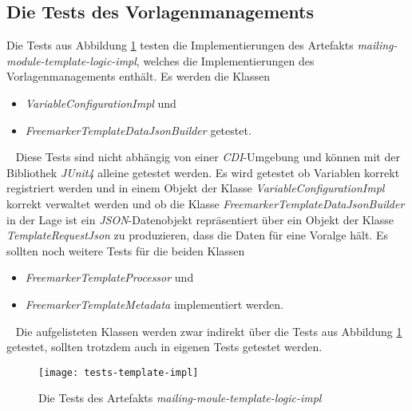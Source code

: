 \subsection{Die Tests des Vorlagenmanagements}
Die Tests aus Abbildung \ref{fig:tests-template-impl} testen die Implementierungen des Artefakts \emph{mailing-module-template-logic-impl}, welches die Implementierungen des Vorlagenmanagements enthält. Es werden die Klassen
\begin{itemize}
	\item \emph{VariableConfigurationImpl} und
	\item \emph{FreemarkerTemplateDataJsonBuilder} getestet.
\end{itemize}
\ \newline
Diese Tests sind nicht abhängig von einer \emph{CDI}-Umgebung und können mit der Bibliothek \emph{JUnit4} alleine getestet werden. Es wird getestet ob Variablen korrekt registriert werden und in einem Objekt der Klasse \emph{VariableConfigurationImpl} korrekt verwaltet werden und ob die Klasse \emph{FreemarkerTemplateDataJsonBuilder} in der Lage ist ein \emph{JSON}-Datenobjekt repräsentiert über ein Objekt der Klasse \emph{TemplateRequestJson} zu produzieren, dass die Daten für eine Voralge hält.
\newline
\newline
Es sollten noch weitere Tests für die beiden Klassen 
\begin{itemize}
	\item\emph{FreemarkerTemplateProcessor} und
	\item\emph{FreemarkerTemplateMetadata} implementiert werden.
\end{itemize}
\ \newline
Die aufgelisteten Klassen werden zwar indirekt über die Tests aus Abbildung \ref{fig:tests-template-impl} getestet, sollten trotzdem auch in eigenen Tests getestet werden.
\newpage

\begin{figure}[h]
\centering
\texttt{[image: tests-template-impl]}
\caption{Die Tests des Artefakts \emph{mailing-moule-template-logic-impl}}
\label{fig:tests-template-impl}
\end{figure}

